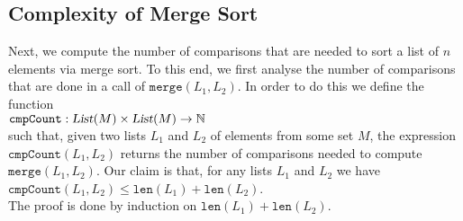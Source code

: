 \subsection{Complexity of Merge Sort}
Next, we compute the number of comparisons that are needed to sort a list of $n$
elements via merge sort.  To this end, we first analyse the number of comparisons that 
are done in a call of $\mathtt{merge}(L_1, L_2)$.   In order to do this we define the function \\[0.2cm]
\hspace*{1.3cm} 
$\mathtt{cmpCount}: \textsl{List}(M) \times \textsl{List}(M) \rightarrow \mathbb{N}$ 
\\[0.2cm]
such that, given two lists $L_1$ and $L_2$ of elements from some set $M$, the expression $\mathtt{cmpCount}(L_1, L_2)$ returns the
number of comparisons needed to compute $\texttt{merge}(L_1,L_2)$. 
Our claim is that, for any lists $L_1$ and $L_2$ we have  
\\[0.2cm]
\hspace*{1.3cm}
$\mathtt{cmpCount}(L_1, L_2) \leq \texttt{len}(L_1) + \texttt{len}(L_2)$. 
\\[0.2cm]
The proof is done by induction on $\texttt{len}(L_1) + \texttt{len}(L_2)$.
